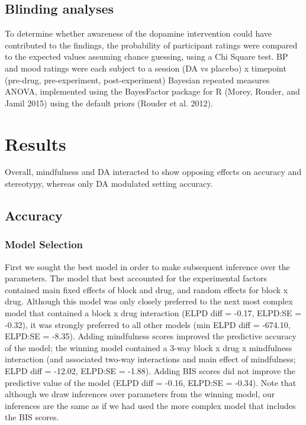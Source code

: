 \documentclass{article}
\begin{document}
\hypertarget{blinding-analyses}{%
\subsection{Blinding analyses}\label{blinding-analyses}}

To determine whether awareness of the dopamine intervention could have
contributed to the findings, the probability of participant ratings were
compared to the expected values assuming chance guessing, using a Chi
Square test. BP and mood ratings were each subject to a session (DA vs
placebo) x timepoint (pre-drug, pre-experiment, post-experiment)
Bayesian repeated measures ANOVA, implemented using the BayesFactor
package for R (Morey, Rouder, and Jamil 2015) using the default priors
(Rouder et al. 2012).

\hypertarget{results}{%
\section{Results}\label{results}}

Overall, mindfulness and DA interacted to show opposing effects on
accuracy and stereotypy, whereas only DA modulated setting accuracy.

\hypertarget{accuracy-1}{%
\subsection{Accuracy}\label{accuracy-1}}

\hypertarget{model-selection}{%
\subsubsection{Model Selection}\label{model-selection}}

First we sought the best model in order to make subsequent inference
over the parameters. The model that best accounted for the experimental
factors contained main fixed effects of block and drug, and random
effects for block x drug. Although this model was only closely preferred
to the next most complex model that contained a block x drug interaction
(ELPD diff = -0.17, ELPD:SE = -0.32), it was strongly preferred to all
other models (min ELPD diff = -674.10, ELPD:SE = -8.35). Adding
mindfulness scores improved the predictive accuracy of the model; the
winning model contained a 3-way block x drug x mindfulness interaction
(and associated two-way interactions and main effect of mindfulness;
ELPD diff = -12.02, ELPD:SE = -1.88). Adding BIS scores did not improve
the predictive value of the model (ELPD diff = -0.16, ELPD:SE = -0.34).
Note that although we draw inferences over parameters from the winning
model, our inferences are the same as if we had used the more complex
model that includes the BIS scores.
\end{document}

